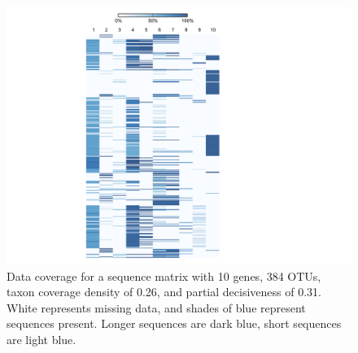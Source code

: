 \documentclass[10pt]{report}
\begin{document}
\begin{figure}[!tpb]
\centerline{\includegraphics[scale=1.0]{figures/sequence_plot.pdf}}
\caption{Data coverage for a sequence matrix with 10 genes, 384 OTUs, taxon coverage density of 0.26, and partial decisiveness of 0.31.
White represents missing data, and shades of blue represent sequences present. Longer sequences are dark blue, short sequences
are light blue.} \label{fig:01}
\end{figure}
\end{document}
